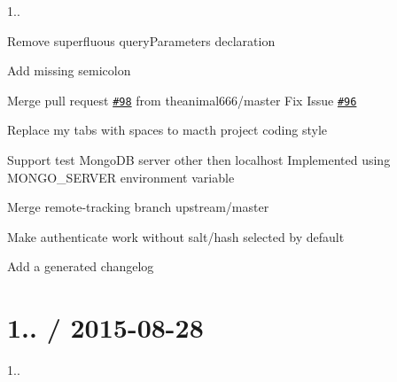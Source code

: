 \begin{DoxyItemize}
\item 1..
\item Remove superfluous query\+Parameters declaration
\item Add missing semicolon
\item Merge pull request \href{https://github.com/saintedlama/passport-local-mongoose/issues/98}{\tt \#98} from theanimal666/master Fix Issue \href{https://github.com/saintedlama/passport-local-mongoose/issues/96}{\tt \#96}
\item Replace my tabs with spaces to macth project coding style
\item Support test Mongo\+DB server other then localhost Implemented using M\+O\+N\+G\+O\+\_\+\+S\+E\+R\+V\+ER environment variable
\item Merge remote-\/tracking branch \textquotesingle{}upstream/master\textquotesingle{}
\item Make authenticate work without salt/hash selected by default
\item Add a generated changelog
\end{DoxyItemize}

\section*{1.. / 2015-\/08-\/28 }


\begin{DoxyItemize}
\item 1.. 
\end{DoxyItemize}